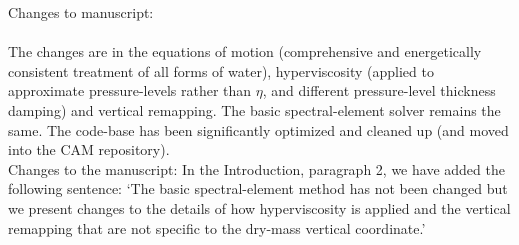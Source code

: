 \documentclass[11pt]{article}
\begin{document}
Changes to manuscript: {\color{blue}{none at this point}}\\

{\color{red}{
Other than the moist-mass effects, have there been any fundamental improvements to the discretization in CAM-SE? Some of the changes demonstrated in the paper are just re-configuration of runtime parameters. Figure 6 shows a major change in the kinetic energy spectrum, but this should be simply due to the new choice of parameters, and doesn't seem to be due to fundamental improvements in the solver. }}\\

The changes are in the equations of motion (comprehensive and energetically consistent treatment of all forms of water), hyperviscosity (applied to approximate pressure-levels rather than $\eta$, and different pressure-level thickness damping) and vertical remapping. The basic spectral-element solver remains the same. The code-base has been significantly optimized and cleaned up (and moved into the CAM repository).\\

Changes to the manuscript: In the Introduction, paragraph 2, we have added the following sentence: `The basic spectral-element method has not been changed but we present changes to the details of how hyperviscosity is applied and the vertical remapping that are not specific to the dry-mass vertical coordinate.' 
\end{document}

